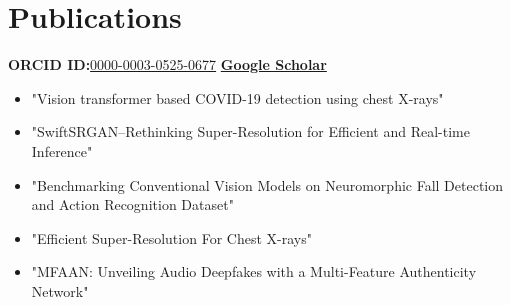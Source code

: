 \documentclass[11pt,a4paper,sans]{moderncv}
\begin{document}
\vspace{10pt}

\section{Publications}
\setlength{\itemsep}{0pt} %
\setlength{\parskip}{0pt} %
\textbf{ORCID ID:}\href{https://orcid.org/0000-0003-0525-0677}{\textcolor{customblue}{0000-0003-0525-0677}} \textbar{} \href{https://scholar.google.ca/citations?hl=en&user=lDmjJtoAAAAJ}{\textbf{Google Scholar}}
\begin{itemize}[leftmargin=0.6cm, label={\textbullet}]
	\item "Vision transformer based COVID-19 detection using chest X-rays"
    \vspace{-4pt}
	\item "SwiftSRGAN--Rethinking Super-Resolution for Efficient and Real-time Inference"
    \vspace{-4pt}
	\item "Benchmarking Conventional Vision Models on Neuromorphic Fall Detection and Action Recognition Dataset"
    \vspace{-4pt}
	\item "Efficient Super-Resolution For Chest X-rays"
    \vspace{-4pt}
	\item "MFAAN: Unveiling Audio Deepfakes with a Multi-Feature Authenticity Network"
\end{itemize}
\end{document}
